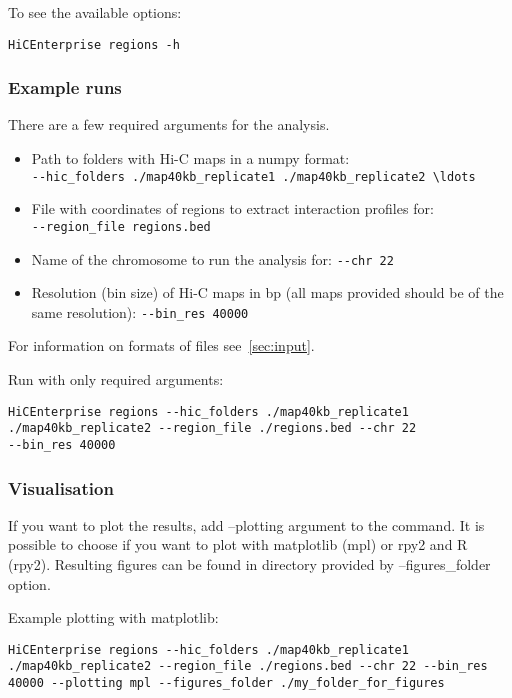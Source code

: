 To see the available options:
\begin{lstlisting}
HiCEnterprise regions -h
\end{lstlisting}

\subsubsection{Example runs}
There are a few required arguments for the analysis.
\begin{itemize}
    \item Path to folders with Hi-C maps in a numpy format: \\
\lstinline{--hic_folders ./map40kb_replicate1 ./map40kb_replicate2 \ldots}
    \item File with coordinates of regions to extract interaction profiles for: \\
\lstinline{--region_file regions.bed}
    \item Name of the chromosome to run the analysis for:  \lstinline{--chr 22}
    \item Resolution (bin size) of Hi-C maps in bp (all maps provided should be of the same resolution): \lstinline{--bin_res 40000}
\end{itemize}

For information on formats of files see~\ref{sec:input}.


Run with only required arguments:
\begin{lstlisting}
HiCEnterprise regions --hic_folders ./map40kb_replicate1 
./map40kb_replicate2 --region_file ./regions.bed --chr 22
--bin_res 40000
\end{lstlisting}

\subsubsection{Visualisation}

If you want to plot the results, add --plotting argument to the command. It is possible to choose if you want to plot
with matplotlib (mpl) or rpy2 and R (rpy2). Resulting figures can be found in directory provided by --figures\_folder
option.

Example plotting with matplotlib:
\begin{lstlisting}
HiCEnterprise regions --hic_folders ./map40kb_replicate1 
./map40kb_replicate2 --region_file ./regions.bed --chr 22 --bin_res
40000 --plotting mpl --figures_folder ./my_folder_for_figures
\end{lstlisting}


